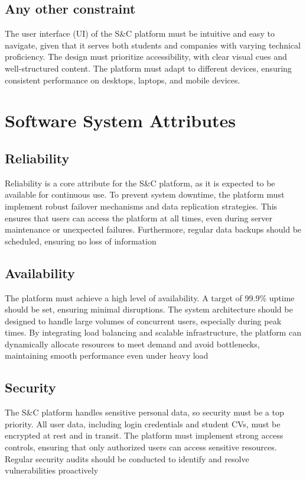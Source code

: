\subsection{Any other constraint}
The user interface (UI) of the S\&C platform must be intuitive and easy to navigate, given that it serves both students and companies with varying technical proficiency. The design must prioritize accessibility, with clear visual cues and well-structured content. The platform must adapt to different devices, ensuring consistent performance on desktops, laptops, and mobile devices.

\section{Software System Attributes}
\subsection{Reliability}
Reliability is a core attribute for the S\&C platform, as it is expected to be available for continuous use. To prevent system downtime, the platform must implement robust failover mechanisms and data replication strategies. This ensures that users can access the platform at all times, even during server maintenance or unexpected failures. Furthermore, regular data backups should be scheduled, ensuring no loss of information

\subsection{Availability}
The platform must achieve a high level of availability. A target of 99.9\% uptime should be set, ensuring minimal disruptions. The system architecture should be designed to handle large volumes of concurrent users, especially during peak times. By integrating load balancing and scalable infrastructure, the platform can dynamically allocate resources to meet demand and avoid bottlenecks, maintaining smooth performance even under heavy load

\subsection{Security}
The S\&C platform handles sensitive personal data, so security must be a top priority. All user data, including login credentials and student CVs, must be encrypted at rest and in transit. The platform must implement strong access controls, ensuring that only authorized users can access sensitive resources. Regular security audits should be conducted to identify and resolve vulnerabilities proactively

